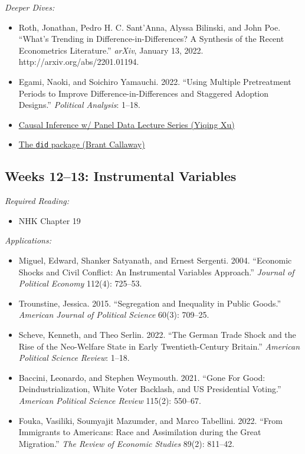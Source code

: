 \documentclass[11pt, letterpaper]{article}
\begin{document}
\noindent \textit{Deeper Dives:}

\begin{itemize}
	\item Roth, Jonathan, Pedro H. C. Sant’Anna, Alyssa Bilinski, and John Poe. ``What’s Trending in Difference-in-Differences? A Synthesis of the Recent Econometrics Literature.'' \textit{arXiv}, January 13, 2022. http://arxiv.org/abs/2201.01194.
	\item Egami, Naoki, and Soichiro Yamauchi. 2022. ``Using Multiple Pretreatment Periods to Improve Difference-in-Differences and Staggered Adoption Designs.'' \textit{Political Analysis}: 1–18.
	\item \href{https://www.youtube.com/user/ariesxyq/videos}{Causal Inference w/ Panel Data Lecture Series (Yiqing Xu)}
	\item \href{https://bcallaway11.github.io/did/articles/did-basics.html}{The \texttt{did} package (Brant Callaway)}
\end{itemize}

\subsection*{Weeks 12--13: Instrumental Variables}

\textit{Required Reading:}

\begin{itemize}
	\item NHK Chapter 19
\end{itemize}

\noindent\textit{Applications:}

\begin{itemize}
	\item Miguel, Edward, Shanker Satyanath, and Ernest Sergenti. 2004. ``Economic Shocks and Civil Conflict: An Instrumental Variables Approach.'' \textit{Journal of Political Economy} 112(4): 725–53.
	\item Trounstine, Jessica. 2015. ``Segregation and Inequality in Public Goods.'' \textit{American Journal of Political Science} 60(3): 709–25.
	\item Scheve, Kenneth, and Theo Serlin. 2022. ``The German Trade Shock and the Rise of the Neo-Welfare State in Early Twentieth-Century Britain.'' \textit{American Political Science Review}: 1–18.
	\item Baccini, Leonardo, and Stephen Weymouth. 2021. ``Gone For Good: Deindustrialization, White Voter Backlash, and US Presidential Voting.'' \textit{American Political Science Review} 115(2): 550–67.
	\item Fouka, Vasiliki, Soumyajit Mazumder, and Marco Tabellini. 2022. ``From Immigrants to Americans: Race and Assimilation during the Great Migration.'' \textit{The Review of Economic Studies} 89(2): 811–42.
\end{itemize}
\end{document}

